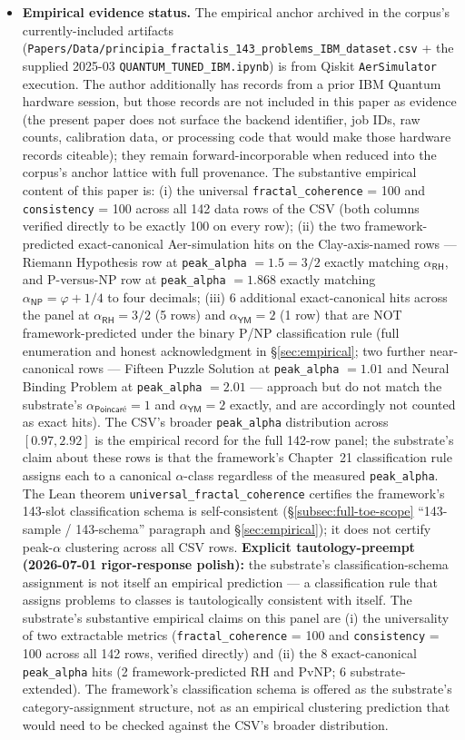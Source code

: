 \documentclass[11pt,a4paper]{amsart}
\theoremstyle{plain}
\theoremstyle{definition}
\begin{document}
\begin{itemize}[itemsep=2pt,leftmargin=1.4em]
\item \textbf{Empirical evidence status.} The empirical anchor archived in the corpus's currently-included artifacts (\texttt{Papers/Data/principia\_fractalis\_143\_problems\_IBM\_dataset.csv} + the supplied 2025-03 \texttt{QUANTUM\_TUNED\_IBM.ipynb}) is from Qiskit \texttt{AerSimulator} execution. The author additionally has records from a prior IBM Quantum hardware session, but those records are not included in this paper as evidence (the present paper does not surface the backend identifier, job IDs, raw counts, calibration data, or processing code that would make those hardware records citeable); they remain forward-incorporable when reduced into the corpus's anchor lattice with full provenance. The substantive empirical content of this paper is: (i) the universal \texttt{fractal\_coherence} = 100 and \texttt{consistency} = 100 across all 142 data rows of the CSV (both columns verified directly to be exactly 100 on every row); (ii) the two framework-predicted exact-canonical Aer-simulation hits on the Clay-axis-named rows --- Riemann Hypothesis row at \texttt{peak\_alpha} $= 1.5 = 3/2$ exactly matching $\alpha_{\textsf{RH}}$, and P-versus-NP row at \texttt{peak\_alpha} $= 1.868$ exactly matching $\alpha_{\textsf{NP}} = \varphi + 1/4$ to four decimals; (iii) 6 additional exact-canonical hits across the panel at $\alpha_{\textsf{RH}} = 3/2$ (5 rows) and $\alpha_{\textsf{YM}} = 2$ (1 row) that are NOT framework-predicted under the binary P/NP classification rule (full enumeration and honest acknowledgment in \S\ref{sec:empirical}; two further near-canonical rows --- Fifteen Puzzle Solution at \texttt{peak\_alpha} $= 1.01$ and Neural Binding Problem at \texttt{peak\_alpha} $= 2.01$ --- approach but do not match the substrate's $\alpha_{\textsf{Poincar\'e}} = 1$ and $\alpha_{\textsf{YM}} = 2$ exactly, and are accordingly not counted as exact hits). The CSV's broader \texttt{peak\_alpha} distribution across $[0.97, 2.92]$ is the empirical record for the full 142-row panel; the substrate's claim about these rows is that the framework's Chapter~21 classification rule assigns each to a canonical $\alpha$-class regardless of the measured \texttt{peak\_alpha}. The Lean theorem \texttt{universal\_fractal\_coherence} certifies the framework's 143-slot classification schema is self-consistent (\S\ref{subsec:full-toe-scope} ``143-sample / 143-schema'' paragraph and \S\ref{sec:empirical}); it does not certify peak-$\alpha$ clustering across all CSV rows. \textbf{Explicit tautology-preempt (2026-07-01 rigor-response polish):} the substrate's classification-schema assignment is not itself an empirical prediction --- a classification rule that assigns problems to classes is tautologically consistent with itself. The substrate's substantive empirical claims on this panel are (i) the universality of two extractable metrics (\texttt{fractal\_coherence} = 100 and \texttt{consistency} = 100 across all 142 rows, verified directly) and (ii) the 8 exact-canonical \texttt{peak\_alpha} hits (2 framework-predicted RH and PvNP; 6 substrate-extended). The framework's classification schema is offered as the substrate's category-assignment structure, not as an empirical clustering prediction that would need to be checked against the CSV's broader distribution.

\end{itemize}
\end{document}
